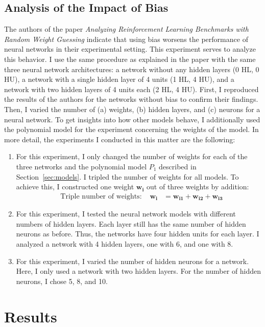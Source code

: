 \subsection{Analysis of the Impact of Bias}
The authors of the paper \emph{Analyzing Reinforcement Learning Benchmarks with Random Weight Guessing} indicate that using bias worsens the performance of neural networks in their experimental setting. This experiment serves to analyze this behavior. I use the same procedure as explained in the paper with the same three neural network architectures: a network without any hidden layers (0 HL, 0 HU), a network with a single hidden layer of 4 units (1 HL, 4 HU), and a network with two hidden layers of 4 units each (2 HL, 4 HU). First, I reproduced the results of the authors for the networks without bias to confirm their findings. Then, I varied the number of (a) weights, (b) hidden layers, and (c) neurons for a neural network. To get insights into how other models behave, I additionally used the polynomial model for the experiment concerning the weights of the model. In more detail, the experiments I conducted in this matter are the following:
\begin{enumerate}[label=(\alph*)]
  \item For this experiment, I only changed the number of weights for each of the three networks and the polynomial model $P_1$ described in Section~\ref{sec:models}. I tripled the number of weights for all models. To achieve this, I constructed one weight $\mathbf{w_i}$ out of three weights by addition:
  \begin{align*}
    &\text{Triple number of weights: } &\mathbf{w_{i}} &= \mathbf{w_{i1}} + \mathbf{w_{i2}} + \mathbf{w_{i3}}
  \end{align*}
  \item For this experiment, I tested the neural network models with different numbers of hidden layers. Each layer still has the same number of hidden neurons as before. Thus, the networks have four hidden units for each layer. I analyzed a network with 4 hidden layers, one with 6, and one with 8.
  \item For this experiment, I varied the number of hidden neurons for a network. Here, I only used a network with two hidden layers. For the number of hidden neurons, I chose 5, 8, and 10.
\end{enumerate}

\section{Results}
